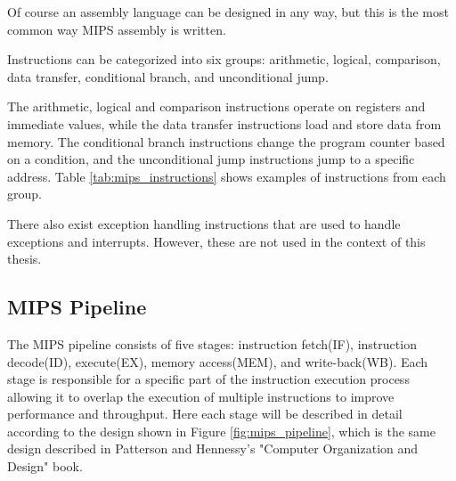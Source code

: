 Of course an assembly language can be designed in any way, but this is the most common way MIPS assembly is written.

Instructions can be categorized into six groups: arithmetic, logical, comparison, data transfer, conditional branch, and unconditional jump. 

The arithmetic, logical and comparison instructions operate on registers and immediate values, while the data transfer instructions load and store data from memory. The conditional branch instructions change the program counter based on a condition, and the unconditional jump instructions jump to a specific address. Table \ref{tab:mips_instructions} shows examples of instructions from each group.
\begin{table}[H]
    \centering
    \caption{Example MIPS Assembly Instructions for Each Group}
    \label{tab:mips_instructions}
\end{table}

There also exist exception handling instructions that are used to handle exceptions and interrupts. However, these are not used in the context of this thesis.

\subsection{MIPS Pipeline}\label{sec:mips_pipeline}
The MIPS pipeline consists of five stages: instruction fetch(IF), instruction decode(ID), execute(EX), memory access(MEM), and write-back(WB). Each stage is responsible for a specific part of the instruction execution process allowing it to overlap the execution of multiple instructions to improve performance and throughput. Here each stage will be described in detail according to the design shown in Figure \ref{fig:mips_pipeline}, which is the same design described in Patterson and Hennessy's "Computer Organization and Design" book\cite{patterson1994computer}.

